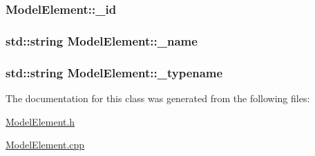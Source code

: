 \subsubsection[{\texorpdfstring{\+\_\+id}{_id}}]{ Model\+Element\+::\+\_\+id\hspace{0.3cm}{\ttfamily [protected]}}\hypertarget{class_model_element_a6fad7713205faa286c8da77d1eb4c75b}{}\label{class_model_element_a6fad7713205faa286c8da77d1eb4c75b}
\subsubsection[{\texorpdfstring{\+\_\+name}{_name}}]{\setlength{\rightskip}{0pt plus 5cm}std\+::string Model\+Element\+::\+\_\+name\hspace{0.3cm}{\ttfamily [protected]}}\hypertarget{class_model_element_a4596c8a39e5df84d6f34249289eeeab8}{}\label{class_model_element_a4596c8a39e5df84d6f34249289eeeab8}
\subsubsection[{\texorpdfstring{\+\_\+typename}{_typename}}]{\setlength{\rightskip}{0pt plus 5cm}std\+::string Model\+Element\+::\+\_\+typename\hspace{0.3cm}{\ttfamily [protected]}}\hypertarget{class_model_element_a6c4a58886b4ca51831ad096d0b994e0b}{}\label{class_model_element_a6c4a58886b4ca51831ad096d0b994e0b}


The documentation for this class was generated from the following files\+:\begin{DoxyCompactItemize}
\item 
\hyperlink{_model_element_8h}{Model\+Element.\+h}\item 
\hyperlink{_model_element_8cpp}{Model\+Element.\+cpp}\end{DoxyCompactItemize}
